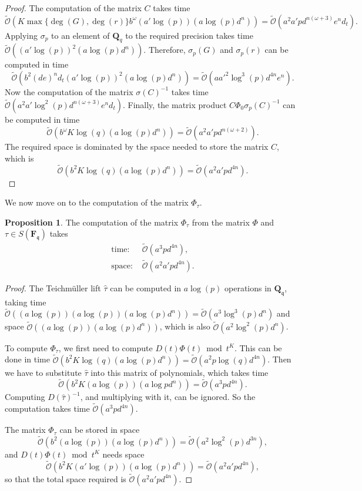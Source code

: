 \documentclass[a4paper,11pt]{article}
\numberwithin{equation}{section}
\newcommand{\QQ}{\mathbf{Q}} %
\newcommand{\FF}{\mathbf{F}} %
\theoremstyle{definition}
\newtheorem{prop}[thm]{Proposition}
\begin{document}
\begin{proof}
The computation of the matrix $C$ takes time
\[
\tilde{\mathcal{O}}(K \max\{\deg(G),\deg(r)\} b^{\omega} (a'\log(p)) (a \log(p) d^n)) = 
\tilde{\mathcal{O}}(a^2 a' p d^{n(\omega+3)}e^n d_t).
\] 
Applying $\sigma_p$ to an element of $\QQ_q$ to the required precision
takes time $\tilde{\mathcal{O}}((a' \log(p))^2(a\log(p)d^n))$. Therefore, $\sigma_p(G)$ and $\sigma_p(r)$ 
can be computed in time 
\[
\tilde{\mathcal{O}}(b^2 (de)^n d_t (a' \log(p))^2 (a\log(p)d^n))=\tilde{\mathcal{O}}(a a'^2 \log^3(p) d^{4n} e^n ).
\] 
Now the computation of the matrix $\sigma(C)^{-1}$ takes time $\tilde{\mathcal{O}}(a^2 a' \log^2(p) d^{n(\omega+3)}e^n d_t)$. 
Finally, the matrix product $C \Phi_0 \sigma_p(C)^{-1}$ can be computed in time 
\[
\tilde{\mathcal{O}}(b^{\omega} K \log(q) (a \log(p) d^n)) = \tilde{\mathcal{O}}(a^2 a' p d^{n(\omega+2)}).
\]
The required space is dominated by the space needed to store the matrix $C$, which is
\[
\tilde{\mathcal{O}}(b^2 K \log(q) (a \log(p) d^n)) = \tilde{\mathcal{O}}(a^2 a' p d^{4n}).
\]
\end{proof}

We now move on to the computation of the matrix $\Phi_{\tau}$.

\begin{prop}
The computation of the matrix $\Phi_{\tau}$ from the matrix $\Phi$ and $\tau \in S(\FF_{\mathfrak{q}})$ takes
\begin{align*}
\mbox{time: }  &\tilde{\mathcal{O}}(a^3 p d^{4n}), \\
\mbox{space: } &\tilde{\mathcal{O}}(a^2 a' p d^{4n}).
\end{align*}
\end{prop}

\begin{proof}
The Teichm\"uller lift $\hat{\tau}$ can be computed in $a \log(p)$ operations
in $\QQ_{\mathfrak{q}}$, taking time 
$\tilde{\mathcal{O}}((a \log(p))(a \log(p)) (a \log(p) d^n))=\tilde{\mathcal{O}}(a^3 \log^3(p) d^n)$ 
and space $\tilde{\mathcal{O}}((a \log(p)) (a \log(p) d^n))$, which is also $\tilde{\mathcal{O}}(a^2 \log^2(p) d^n)$. 

To compute $\Phi_{\tau}$, we first need to compute 
$D(t) \Phi(t) \bmod{t^{K}}$. This can be done in time 
$\tilde{\mathcal{O}}(b^2 K \log(q) (a \log(p) d^n))=\tilde{\mathcal{O}}(a^2 p \log(q) d^{4n})$.
Then we have to substitute $\hat{\tau}$ into this matrix of polynomials, which takes time
\[
\tilde{\mathcal{O}}(b^2 K (a \log(p)) (a \log p d^n))=\tilde{\mathcal{O}}(a^3 p d^{4n}).
\]
Computing $D(\hat{\tau})^{-1}$, and multiplying with it, can be ignored. So the 
computation takes time $\tilde{\mathcal{O}}(a^3 p d^{4n})$.

The matrix $\Phi_{\tau}$ can be stored in space
\[
\tilde{\mathcal{O}}(b^2 (a \log(p))(a \log(p) d^n)) = \tilde{\mathcal{O}}(a^2 \log^2(p)  d^{3n}),
\]
and $D(t) \Phi(t) \bmod{t^{K}}$ needs space
 \[
\tilde{\mathcal{O}}(b^2 K (a' \log(p)) (a \log(p) d^n))= \tilde{\mathcal{O}}(a^2 a' p d^{4n}),
\]
so that the total space required is $\tilde{\mathcal{O}}(a^2 a' p d^{4n})$.
\end{proof}
\end{document}
